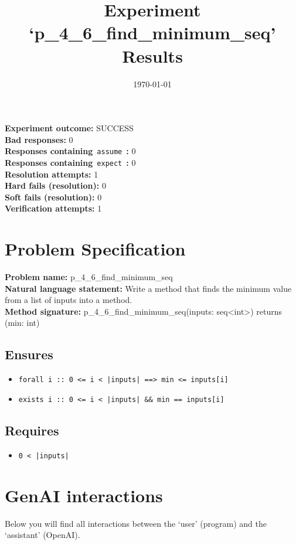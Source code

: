 \documentclass{article}
\begin{document}
\title{Experiment `p\_4\_6\_find\_minimum\_seq' Results}
\author{\today}
\date{}
\maketitle
\textbf{Experiment outcome: }SUCCESS
\\\textbf{Bad responses: }0
\\\textbf{Responses containing}~\texttt{assume}~\textbf{: }0
\\\textbf{Responses containing}~\texttt{expect}~\textbf{: }0
\\\textbf{Resolution attempts: }1
\\\textbf{Hard fails (resolution): }0
\\\textbf{Soft fails (resolution): }0
\\\textbf{Verification attempts: }1
\section*{Problem Specification}
\textbf{Problem name: }p\_4\_6\_find\_minimum\_seq
\\\textbf{Natural language statement: }Write a method that finds the minimum value from a list of inputs into a method.
\\\textbf{Method signature: }p\_4\_6\_find\_minimum\_seq(inputs: seq<int>) returns (min: int)
\subsection*{Ensures}
\begin{itemize}
\item \texttt{forall i :: 0 <= i < |inputs| ==> min <= inputs[i]}
\item \texttt{exists i :: 0 <= i < |inputs| \&\& min == inputs[i]}
\end{itemize}
\subsection*{Requires}
\begin{itemize}
\item \texttt{0 < |inputs|}
\end{itemize}
\clearpage
\section*{GenAI interactions}
Below you will find all interactions between the `user' (program) and the `assistant' (OpenAI).
\end{document}
